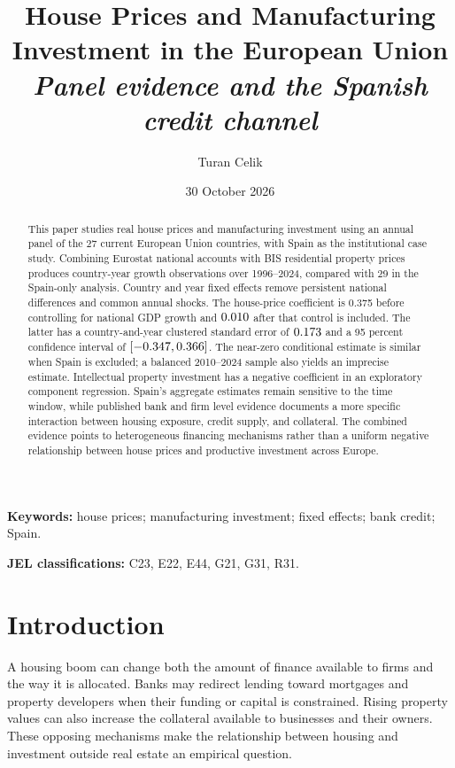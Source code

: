 \documentclass[11pt,letterpaper]{article}
\title{\vspace{-1.2em}\LARGE\bfseries House Prices and Manufacturing\\Investment in the European Union\\[0.55em]
 \large\normalfont\itshape Panel evidence and the Spanish credit channel}
\author{Turan Celik}
\date{30 October 2026}
\begin{document}
\maketitle
\begin{abstract}
This paper studies real house prices and manufacturing investment using an annual panel of the 27 current European Union countries, with Spain as the institutional case study. Combining Eurostat national accounts with BIS residential property prices produces \PanelN{} country-year growth observations over 1996--2024, compared with 29 in the Spain-only analysis. Country and year fixed effects remove persistent national differences and common annual shocks. The house-price coefficient is 0.375 before controlling for national GDP growth and $0.010$ after that control is included. The latter has a country-and-year clustered standard error of $0.173$ and a 95 percent confidence interval of $[-0.347,0.366]$. The near-zero conditional estimate is similar when Spain is excluded; a balanced 2010--2024 sample also yields an imprecise estimate. Intellectual property investment has a negative coefficient in an exploratory component regression. Spain's aggregate estimates remain sensitive to the time window, while published bank and firm level evidence documents a more specific interaction between housing exposure, credit supply, and collateral. The combined evidence points to heterogeneous financing mechanisms rather than a uniform negative relationship between house prices and productive investment across Europe.
\end{abstract}
\begin{center}\begin{minipage}{.90\linewidth}\small{}
\textbf{Keywords:} house prices; manufacturing investment; fixed effects; bank credit; Spain.
\par\smallskip\textbf{JEL classifications:} C23, E22, E44, G21, G31, R31.
\end{minipage}\end{center}
\newpage

\section{Introduction}
A housing boom can change both the amount of finance available to firms and the way it is allocated. Banks may redirect lending toward mortgages and property developers when their funding or capital is constrained. Rising property values can also increase the collateral available to businesses and their owners. These opposing mechanisms make the relationship between housing and investment outside real estate an empirical question.
\end{document}
